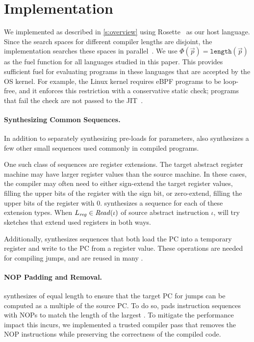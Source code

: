 \section{Implementation}\label{s:impl}
We implemented \jitsynth as described in \autoref{s:overview} using
Rosette~\cite{torlak:rosette} as our host language.
Since the search spaces for different compiler lengths are disjoint,
the \jitsynth implementation searches these spaces in parallel~\cite{bornholt:synapse}.
%
%
We use $\Phi(\vec{p}) = \texttt{length}(\vec{p})$ as the fuel function for all
languages studied in this paper. This provides sufficient fuel for evaluating
programs in these languages that are accepted by the OS kernel. For example, the
Linux kernel requires eBPF programs to be loop-free, and it enforces this
restriction with a conservative static check; programs that fail the check are
not passed to the JIT~\cite{gershuni:crab-ebpf}.

\paragraph{Synthesizing Common Sequences.}
In addition to separately synthesizing pre-loads for parameters,
\jitsynth also synthesizes a few other small sequences used commonly in compiled programs.

One such class of sequences are register extensions.
The target abstract register machine may have larger register values than the source machine.
In these cases, the compiler may often need to either sign-extend the target register values,
filling the upper bits of the register with the sign bit,
or zero-extend, filling the upper bits of the register with 0.
\jitsynth synthesizes a sequence for each of these extension types.
When $L_\mathit{reg}\in\mathit{Read}(\iota)$ of source abstract instruction $\iota$,
\jitsynth will try sketches that extend used registers in both ways.

Additionally, \jitsynth synthesizes sequences
that both load the PC into a temporary register
and write to the PC from a register value.
These operations are needed for compiling jumps,
and are reused in many \minicompilers.

\paragraph{NOP Padding and Removal.}
\jitsynth synthesizes \minicompilers of equal length to ensure that
the target PC for jumps can be computed as a multiple of the source PC.
%
To do so, \jitsynth pads instruction sequences with NOPs to match the length
of the largest \minicompiler.
%
To mitigate the performance impact this incurs, we implemented a trusted compiler
pass that removes the NOP instructions while preserving the correctness of
the compiled code.
\tighten
